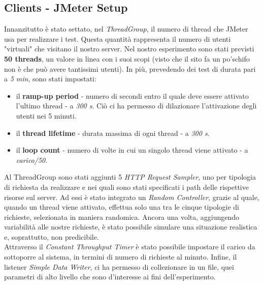 \subsection{Clients - JMeter Setup}
Innanzitutto è stato settato, nel \textit{ThreadGroup}, il numero di thread che JMeter usa per realizzare i test. Questa quantità rappresenta il numero di utenti "virtuali" che visitano il nostro server. Nel nostro esperimento sono stati previsti \textbf{50 threads}, un valore in linea con i suoi scopi (visto che il sito fa un po'schifo non è che può avere tantissimi utenti). In più, prevedendo dei test di durata pari a \textit{5 min}, sono stati impostati:
\begin{itemize}
	\item il \textbf{ramp-up period} - numero di secondi entro il quale deve essere attivato l'ultimo thread - a \textit{300 s}. Ciò ci ha permesso di dilazionare l'attivazione degli utenti nei 5 minuti.
	\item il \textbf{thread lifetime} - durata massima di ogni thread - a \textit{300 s}.
	\item il \textbf{loop count} - numero di volte in cui un singolo thread viene attivato - a \textit{carico/50}.
\end{itemize}     
Al ThreadGroup sono stati aggiunti 5 \textit{HTTP Request Sampler}, uno per tipologia di richiesta da realizzare e nei quali sono stati specificati i path delle rispettive risorse sul server. Ad essi è stato integrato un \textit{Random Controller}, grazie al quale, quando un thread viene attivato, effettua solo una tra le cinque tipologie di richieste, selezionata in maniera randomica. Ancora una volta, aggiungendo variabilità alle nostre richieste, è stato possibile simulare una situazione realistica e, soprattutto, non predicibile.
\\
Attraverso il \textit{Constant Throughput Timer} è stato possibile impostare il carico da sottoporre al sistema, in termini di numero di richieste al minuto. Infine, il listener \textit{Simple Data Writer}, ci ha permesso di collezionare in un file, quei parametri di alto livello che sono d'interesse ai fini dell'esperimento.

